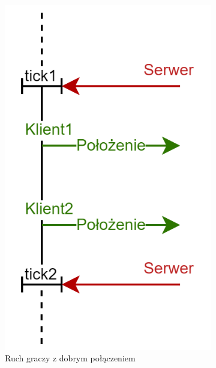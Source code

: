 \documentclass{article}
\begin{document}
\begin{itemize}
\begin{figure}[h]
\begin{subfigure}{.5\textwidth}
          \includegraphics[scale=0.35]{ruch1.png}
          \caption{Ruch graczy z dobrym połączeniem}
          \label{fig:sub1}
        \end{subfigure}%
        \begin{subfigure}{.5\textwidth}
          \centering

\end{subfigure}
\end{figure}
\end{itemize}
\end{document}
